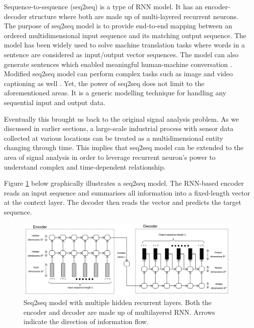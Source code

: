 \documentclass[11pt]{article} %
\theoremstyle{plain}
\theoremstyle{definition}
\begin{document}
Sequence-to-sequence (seq2seq) is a type of RNN model. It has an encoder-decoder structure where both are made up of multi-layered recurrent neurons. The purpose of seq2seq model is to provide end-to-end mapping between an ordered multidimensional input sequence and its matching output sequence. The model has been widely used to solve machine translation tasks where words in a sentence are considered as input/output vector sequences\cite{sutskever2014, cho2014}. The model can also generate sentences which enabled meaningful human-machine conversation \cite{vinyals2015}. Modified seq2seq model can perform complex tasks such as image and video captioning as well \cite{venugopalan2014, vinyals2014}. Yet, the power of seq2seq does not limit to the aforementioned areas. It is a generic modelling technique for handling any sequential input and output data.

Eventually this brought us back to the original signal analysis problem. As we discussed in earlier sections, a large-scale industrial process with sensor data collected at various locations can be treated as a multidimensional entity changing through time. This implies that seq2seq model can be extended to the area of signal analysis in order to leverage recurrent neuron’s power to understand complex and time-dependent relationship.

Figure \ref{fig:seq2seq} below graphically illustrates a seq2seq model. The RNN-based encoder reads an input sequence and summarises all information into a fixed-length vector at the context layer. The decoder then reads the vector and predicts the target sequence.

\begin{figure}[H]
	\centering
	\includegraphics[width=1\textwidth]{seq2seq.PNG}
	\caption{Seq2seq model with multiple hidden recurrent layers. Both the encoder and decoder are made up of multilayered RNN. Arrows indicate the direction of information flow.}
	\label{fig:seq2seq}
\end{figure}
\end{document}

